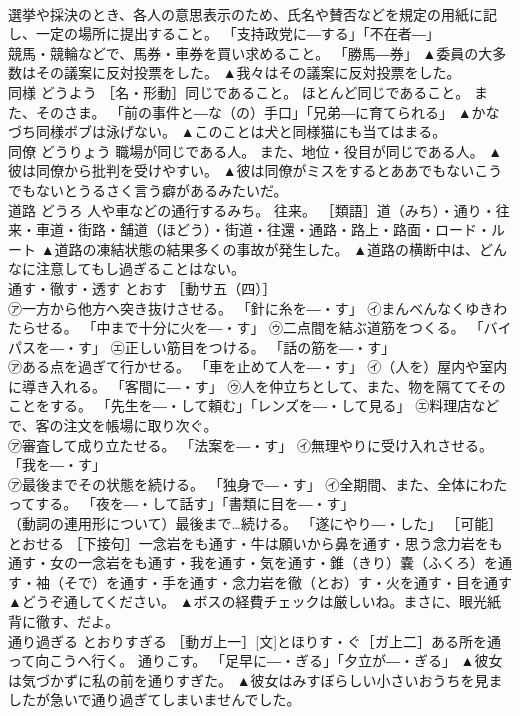 \documentclass[8pt]{extreport}
\begin{document}
\begin{CJK}{UTF8}{min}
\\	選挙や採決のとき、各人の意思表示のため、氏名や賛否などを規定の用紙に記し、一定の場所に提出すること。 「支持政党に―する」「不在者―」 
\\	競馬・競輪などで、馬券・車券を買い求めること。 「勝馬―券」	▲委員の大多数はその議案に反対投票をした。 ▲我々はその議案に反対投票をした。
\\	同様	どうよう	［名・形動］同じであること。 ほとんど同じであること。 また、そのさま。 「前の事件と―な（の）手口」「兄弟―に育てられる」	▲かなづち同様ボブは泳げない。 ▲このことは犬と同様猫にも当てはまる。
\\	同僚	どうりょう	職場が同じである人。 また、地位・役目が同じである人。	▲彼は同僚から批判を受けやすい。 ▲彼は同僚がミスをするとああでもないこうでもないとうるさく言う癖があるみたいだ。
\\	道路	どうろ	人や車などの通行するみち。 往来。 ［類語］道（みち）・通り・往来・車道・街路・舗道（ほどう）・街道・往還・通路・路上・路面・ロード・ルート	▲道路の凍結状態の結果多くの事故が発生した。 ▲道路の横断中は、どんなに注意してもし過ぎることはない。
\\	通す・徹す・透す	とおす	［動サ五（四）］ 
\\	㋐一方から他方へ突き抜けさせる。 「針に糸を―・す」 ㋑まんべんなくゆきわたらせる。 「中まで十分に火を―・す」 ㋒二点間を結ぶ道筋をつくる。 「バイパスを―・す」 ㋓正しい筋目をつける。 「話の筋を―・す」 
\\	㋐ある点を過ぎて行かせる。 「車を止めて人を―・す」 ㋑（人を）屋内や室内に導き入れる。 「客間に―・す」 ㋒人を仲立ちとして、また、物を隔ててそのことをする。 「先生を―・して頼む」「レンズを―・して見る」 ㋓料理店などで、客の注文を帳場に取り次ぐ。 
\\	㋐審査して成り立たせる。 「法案を―・す」 ㋑無理やりに受け入れさせる。 「我を―・す」 
\\	㋐最後までその状態を続ける。 「独身で―・す」 ㋑全期間、また、全体にわたってする。 「夜を―・して話す」「書類に目を―・す」 
\\	（動詞の連用形について）最後まで…続ける。 「遂にやり―・した」 ［可能］とおせる ［下接句］一念岩をも通す・牛は願いから鼻を通す・思う念力岩をも通す・女の一念岩をも通す・我を通す・気を通す・錐（きり）嚢（ふくろ）を通す・袖（そで）を通す・手を通す・念力岩を徹（とお）す・火を通す・目を通す	▲どうぞ通してください。 ▲ボスの経費チェックは厳しいね。まさに、眼光紙背に徹す、だよ。
\\	通り過ぎる	とおりすぎる	［動ガ上一］[文]とほりす・ぐ［ガ上二］ある所を通って向こうへ行く。 通りこす。 「足早に―・ぎる」「夕立が―・ぎる」	▲彼女は気づかずに私の前を通りすぎた。 ▲彼女はみすぼらしい小さいおうちを見ましたが急いで通り過ぎてしまいませんでした。

\end{CJK}
\end{document}
